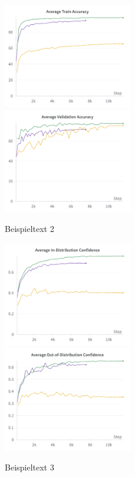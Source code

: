 \begin{figure}[h]
	\centering
	\includegraphics[width=0.5\textwidth]{figure_results_supcon-lin_avg-train-acc.png}%
	\includegraphics[width=0.5\textwidth]{figure_results_supcon-lin_avg-val-acc.png}
	\caption{Beispieltext 2}
	\label{fig:supcon-lin-acc}
\end{figure}
\begin{figure}[h]
	\centering
	\includegraphics[width=0.5\textwidth]{figure_results_supcon-lin_avg-id-conf.png}%
	\includegraphics[width=0.5\textwidth]{figure_results_supcon-lin_avg-ood-conf.png}
	\caption{Beispieltext 3}
	\label{fig:supcon-lin-ood-detection}
\end{figure}

